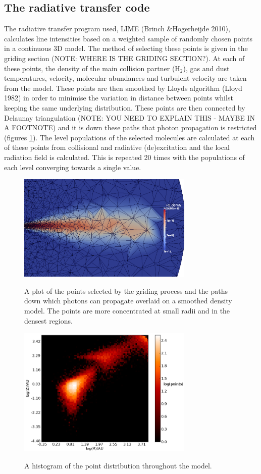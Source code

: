 \documentclass[useAMS,usenatbib]{mn2e}
\begin{document}
\subsection{The radiative transfer code} \label{subsec:radiative_transfer_code}
The radiative transfer program used, LIME (Brinch \&Hogerheijde 2010), calculates line intensities based on a weighted sample of randomly chosen points in a continuous 3D model. The method of selecting these points is given in the griding section (NOTE: WHERE IS THE GRIDING SECTION?). At each of these points, the density of the main collision partner (H$_2$), gas and dust temperatures, velocity, molecular abundances and turbulent velocity are taken from the model. These points are then smoothed by Lloyds algorithm (Lloyd 1982) in order to minimise the variation in distance between points whilst keeping the same underlying distribution. These points are then connected by Delaunay triangulation (NOTE: YOU NEED TO EXPLAIN THIS - MAYBE IN A FOOTNOTE) and it is down these paths that photon propagation is restricted (figures \ref{grid}). The level populations of the selected molecules are calculated at each of these points from collisional and radiative (de)excitation and the local radiation field is calculated. This is repeated 20 times with the populations of each level converging towards a single value.\newline


\begin{figure}
 \includegraphics[width=84mm]{Figures/model/Lime_grid3.png}
 \label{grid}
 \caption{A plot of the points selected by the griding process and the paths down which photons can propagate overlaid on a smoothed density model. The points are more concentrated at small radii and in the densest regions.}
\end{figure}

\begin{figure}
 \includegraphics[width=84mm]{Figures/model/lime_points_rz_histo.png}
 \label{points}
 \caption{A histogram of the point distribution throughout the model.}
\end{figure}
\end{document}
